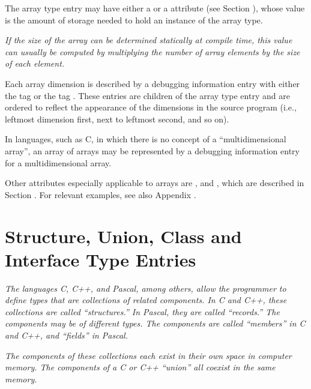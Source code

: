 The array type entry may have either a  or a
 attribute 
(see Section ), 
whose value is the
amount of storage needed to hold an instance of the array type.

\textit{If the size of the array can be determined statically at
compile time, this value can usually be computed by multiplying
the number of array elements by the size of each element.}


Each array dimension is described by a debugging information
entry with either the tag  or the tag
. These entries are children of the
array type entry and are ordered to reflect the appearance of
the dimensions in the source program (i.e., leftmost dimension
first, next to leftmost second, and so on).

In languages, such as C, in which there is no concept of
a “multidimensional array”, an array of arrays may
be represented by a debugging information entry for a
multidimensional array.

Other attributes especially applicable to arrays are
,  and ,
which are described in 
Section . 
For relevant examples,
see also 
Appendix .

\section{ Structure, Union, Class and Interface Type Entries}
\label{chap:structureunionclassandinterfacetypeentries}

\textit{The languages C, C++, and Pascal, among others, allow the
programmer to define types that are collections of related
components. In C and C++, these collections are called
“structures.” In Pascal, they are called “records.”
The components may be of different types. The components are
called “members” in C and C++, and “fields” in Pascal.}

\textit{The components of these collections each exist in their
own space in computer memory. The components of a C or C++
“union” all coexist in the same memory.}

